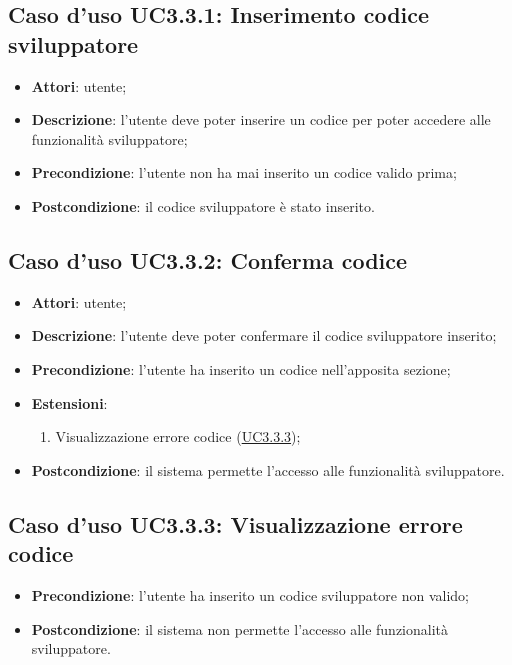 \documentclass[../AnalisiDeiRequisiti.tex]{subfiles}
\begin{document}
\subsection{Caso d'uso UC3.3.1: Inserimento codice sviluppatore}
\begin{itemize}
\item \textbf{Attori}: utente;
\item \textbf{Descrizione}: l'utente deve poter inserire un codice per poter accedere alle funzionalità sviluppatore; 
      \item \textbf{Precondizione}: l'utente non ha mai inserito un codice valido prima;
    \item \textbf{Postcondizione}: il codice sviluppatore è stato inserito.
  \end{itemize}
\hypertarget{UC3.3.2}{}
\subsection{Caso d'uso UC3.3.2: Conferma codice}
\begin{itemize}
\item \textbf{Attori}: utente;
\item \textbf{Descrizione}: l'utente deve poter confermare il codice sviluppatore inserito; 
      \item \textbf{Precondizione}: l'utente ha inserito un codice nell'apposita sezione;
    \item \textbf{Estensioni}:
      \begin{enumerate}
          \item Visualizzazione errore codice (\hyperlink{UC3.3.3}{UC3.3.3});

      \end{enumerate}
    \item \textbf{Postcondizione}: il sistema permette l'accesso alle funzionalità sviluppatore.
  \end{itemize}
\hypertarget{UC3.3.3}{}
\subsection{Caso d'uso UC3.3.3: Visualizzazione errore codice}
\begin{itemize}
    \item \textbf{Precondizione}: l'utente ha inserito un codice sviluppatore non valido;
    \item \textbf{Postcondizione}: il sistema non permette l'accesso alle funzionalità sviluppatore.
  \end{itemize}
\hypertarget{UC4}{}
\end{document}
